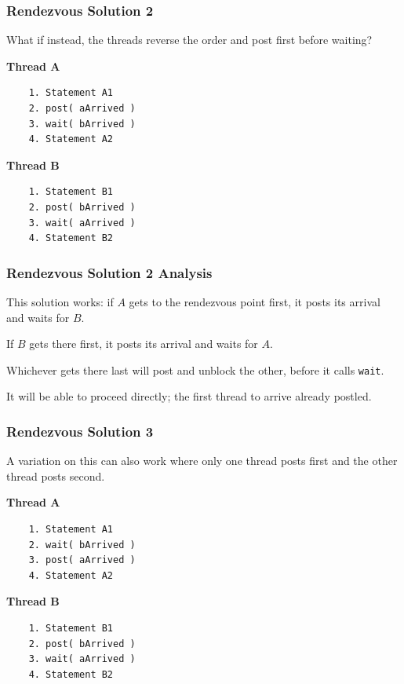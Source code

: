 \begin{frame}[fragile]
\frametitle{Rendezvous Solution 2}

What if instead, the threads reverse the order and post first before waiting?

\begin{multicols}{2}
\textbf{Thread A}
  \begin{verbatim}
	1. Statement A1
	2. post( aArrived )
	3. wait( bArrived )
	4. Statement A2
  \end{verbatim}
\columnbreak
\textbf{Thread B}
  \begin{verbatim}
	1. Statement B1
	2. post( bArrived )
	3. wait( aArrived )
	4. Statement B2
  \end{verbatim}
\end{multicols}
\vspace{-2em}


\end{frame}

\begin{frame}
\frametitle{Rendezvous Solution 2 Analysis}

This solution works: if $A$ gets to the rendezvous point first, it posts its arrival and waits for $B$. 

If $B$ gets there first, it posts its arrival and waits for $A$. 

Whichever gets there last will post and unblock the other, before it calls \texttt{wait}.

It will be able to proceed directly; the first thread to arrive already postled. 


\end{frame}

\begin{frame}[fragile]
\frametitle{Rendezvous Solution 3}

A variation on this can also work where only one thread posts first and the other thread posts second.

\begin{multicols}{2}
\textbf{Thread A}
  \begin{verbatim}
	1. Statement A1
	2. wait( bArrived )
	3. post( aArrived )
	4. Statement A2
  \end{verbatim}
\columnbreak
\textbf{Thread B}
  \begin{verbatim}
	1. Statement B1
	2. post( bArrived )
	3. wait( aArrived )
	4. Statement B2
  \end{verbatim}
\end{multicols}
\vspace{-2em}


\end{frame}


